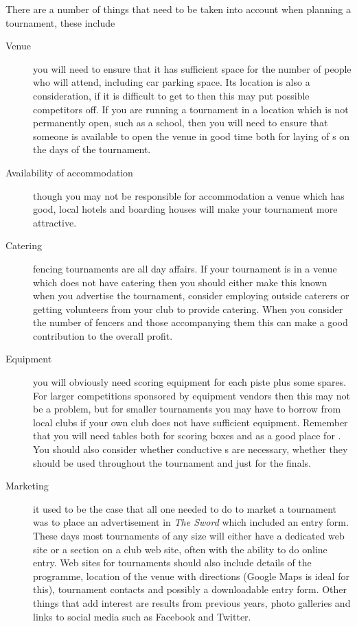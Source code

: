 \documentclass[a4paper,11pt]{memoir}
\begin{document}
There are a number of things that need to be taken into account when planning a tournament, these include
\begin{description}
 \item[Venue] you will need to ensure that it has sufficient space for the number of people who will attend, including car parking space. Its location is also a consideration, if it is difficult to get to then this may put possible competitors off. If you are running a tournament in a location which is not permanently open, such as a school, then you will need to ensure that someone is available to open the venue in good time both for laying of s on the days of the tournament.
 \item[Availability of accommodation] though you may not be responsible for accommodation a venue which has good, local hotels and boarding houses will make your tournament more attractive.
 \item[Catering] fencing tournaments are all day affairs. If your tournament is in a venue which does not have catering then you should either make this known when you advertise the tournament, consider employing outside caterers or getting volunteers from your club to provide catering. When you consider the number of fencers and those accompanying them this can make a good contribution to the overall profit.
 \item[Equipment] you will obviously need scoring equipment for each \gls{piste} plus some spares. For larger competitions sponsored by equipment vendors then this may not be a problem, but for smaller tournaments you may have to borrow from local clubs if your own club does not have sufficient equipment. Remember that you will need tables both for scoring boxes and as a good place for  . You should also consider whether conductive s are necessary, whether they should be used throughout the tournament and just for the finals.
 \item[Marketing] it used to be the case that all one needed to do to market a tournament was to place an advertisement in \emph{The Sword} which included an entry form. These days most tournaments of any size will either have a dedicated web site or a section on a club web site, often with the ability to do online entry. Web sites for tournaments should also include details of the programme, location of the venue with directions (Google Maps is ideal for this), tournament contacts and possibly a downloadable entry form. Other things that add interest are results from previous years, photo galleries and links to social media such as Facebook and Twitter. 

\end{description}
\end{document}
